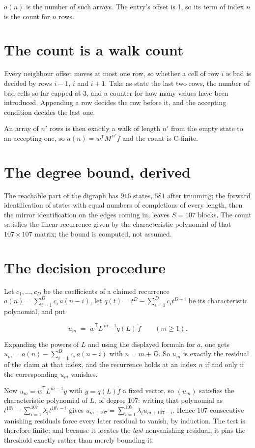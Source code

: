 \documentclass[11pt]{article}
\theoremstyle{definition}
\begin{document}
$a(n)$ is the number of such arrays. The entry's offset is 1, so its term of index $n$ is the count for $n$ rows.

\section{The count is a walk count}

Every neighbour offset moves at most one row, so whether a cell of row $i$ is bad is decided by rows $i-1$, $i$ and $i+1$. Take as state the last two rows, the number of bad cells so far capped at 3, and a counter for how many values have been introduced. Appending a row decides the row before it, and the accepting condition decides the last one.

An array of $n'$ rows is then exactly a walk of length $n'$ from the empty state to an accepting one, so $a(n) = w^{\mathsf T}M^{\,n'}f$ and the count is C-finite.

\section{The degree bound, derived}

The reachable part of the digraph has $916$ states, $581$ after trimming; the forward identification of states with equal numbers of completions of every length, then the mirror identification on the edges coming in, leaves $S = 107$ blocks. The count satisfies the linear recurrence given by the characteristic polynomial of that $107\times107$ matrix; the bound is computed, not assumed.

\section{The decision procedure}

Let $c_1,\dots,c_D$ be the coefficients of a claimed recurrence $a(n) = \sum_{i=1}^{D} c_i\,a(n-i)$, let $q(t) = t^{D} - \sum_{i=1}^{D} c_i t^{D-i}$ be its characteristic polynomial, and put

\[u_m \;=\; \tilde w^{\mathsf T} L^{\,m-1} q(L)\,\tilde f \qquad (m \ge 1).\]

Expanding the powers of $L$ and using the displayed formula for $a$, one gets $u_m = a(n) - \sum_{i=1}^{D} c_i\,a(n-i)$ with $n = m + D$. So $u_m$ is exactly the residual of the claim at that index, and the recurrence holds at an index $n$ if and only if the corresponding $u_m$ vanishes.

Now $u_m = \tilde w^{\mathsf T} L^{m-1} y$ with $y = q(L)\tilde f$ a fixed vector, so $(u_m)$ satisfies the characteristic polynomial of $L$, of degree $107$: writing that polynomial as $t^{107} - \sum_{i=1}^{107} \lambda_i t^{107-i}$ gives $u_{m+107} = \sum_{i=1}^{107} \lambda_i u_{m+107-i}$. Hence $107$ consecutive vanishing residuals force every later residual to vanish, by induction. The test is therefore finite; and because it locates the {\itshape last} nonvanishing residual, it pins the threshold exactly rather than merely bounding it.
\end{document}
